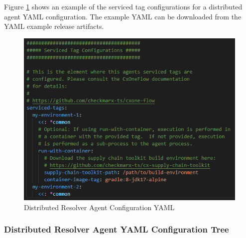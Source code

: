 Figure \ref{fig:resolver-agent-config-yaml} shows an example of the serviced tag configurations for 
a distributed agent YAML configuration.  The example YAML can be downloaded from the \cxoneflow YAML
example release artifacts.

\begin{figure}[h]
    \includegraphics[width=\textwidth]{graphics/resolver-agent-config-yaml.png}
    \caption{Distributed Resolver Agent Configuration YAML}
    \label{fig:resolver-agent-config-yaml}
\end{figure}

\pagebreak

\subsubsection{Distributed Resolver Agent YAML Configuration Tree}\label{sec:agent-yaml-root}


